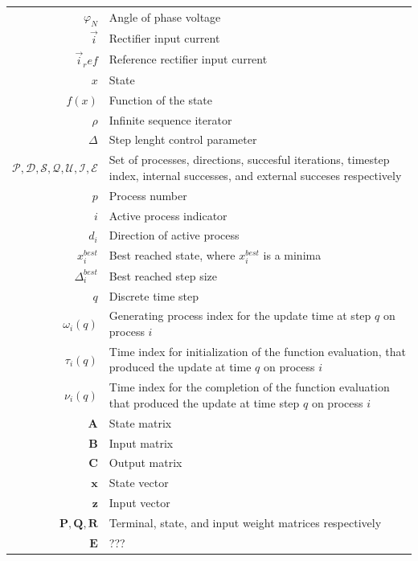 \begin{scriptsize}
\begin{tabularx}{\textwidth}{r|X}
	$\varphi_N$												& Angle of phase voltage\\
	$\vec{i}$													& Rectifier input current\\
	$\vec{i}_ref$											& Reference rectifier input current\\
	$x$																& State\\
	$f(x)$														& Function of the state\\
	$\rho$																& Infinite sequence iterator\\
	$\Delta$													& Step lenght control parameter\\
	$\mathcal{P},\mathcal{D},\mathcal{S},\mathcal{Q},\mathcal{U},\mathcal{I},\mathcal{E}$ & Set of processes, directions, succesful iterations, timestep index, internal successes, and external succeses respectively\\
	$p$																& Process number\\
	$i$																& Active process indicator\\
	$d_i$															& Direction of active process\\
	$x_i^{best}$											& Best reached state, where $x_i^{best}$ is a minima\\
	$\Delta_i^{best}$											& Best reached step size\\
	$q$																& Discrete time step\\
	$\omega_i(q)$ 										& Generating process index for the update time at step $q$ on process $i$\\
	$\tau_i(q)$												& Time index for initialization of the function evaluation, that produced the update at time $q$ on process $i$\\
	$\nu_i(q)$ 												& Time index for the completion of the function evaluation that produced the update at time step $q$ on process $i$\\
	$\textbf{A}$																& State matrix\\
	$\textbf{B}$																& Input matrix\\
	$\textbf{C}$																& Output matrix\\
	$\textbf{x}$											& State vector\\
	$\textbf{z}$											& Input vector\\
	$\textbf{P}, \textbf{Q},\textbf{R}$ & Terminal, state, and input weight matrices respectively\\
	$\textbf{E}$																&???\\

\end{tabularx}
\end{scriptsize}
